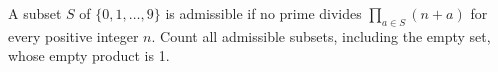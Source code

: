 A subset $S$ of $\{0,1,\ldots,9\}$ is admissible if no prime divides $\prod_{a\in S}(n+a)$ for every positive integer $n$. Count all admissible subsets, including the empty set, whose empty product is 1.

